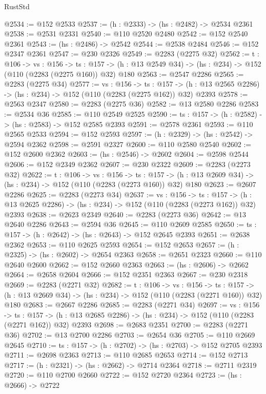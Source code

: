 \begin{lexlean}{RustStd}
\begin{coremodule}
@2534 := @152 @2533
@2537 := (h : @2333) -> (hs : @2482) -> @2534 @2361
@2538 := @2531 @2331
@2540 := @110 @2520 @2480
@2542 := @152 @2540 @2361
@2543 := (hs : @2486) -> @2542
@2544 := @2538 @2484
@2546 := @152 @2347 @2361
@2547 := @230 @2326
@2549 := @2283 (@2275 @32)
@2562 := {t : @106} ->
  {vs : @156} ->
  {ts : @157} -> (h : @13 @2549 @34) -> (hs : @234) -> @152 (@110 (@2283 (@2275 @160)) @32) @180
@2563 := @2547 @2286
@2565 := @2283 (@2275 @34)
@2577 := {vs : @156} ->
  {ts : @157} -> (h : @13 @2565 @2286) -> (hs : @234) -> @152 (@110 (@2283 (@2275 @162)) @32) @2393
@2578 := @2563 @2347
@2580 := @2283 (@2275 @36)
@2582 := @13 @2580 @2286
@2583 := @2534 @36
@2585 := @110 @2549 @2525
@2590 := {ts : @157} -> (h : @2582) -> (hs : @2583) -> @152 @2585 @2393
@2591 := @2578 @2361
@2593 := @110 @2565 @2533
@2594 := @152 @2593
@2597 := (h : @2329) -> (hs : @2542) -> @2594 @2362
@2598 := @2591 @2327
@2600 := @110 @2580 @2540
@2602 := @152 @2600 @2362
@2603 := (hs : @2546) -> @2602
@2604 := @2598 @2544
@2606 := @152 @2349 @2362
@2607 := @230 @2322
@2609 := @2283 (@2273 @32)
@2622 := {t : @106} ->
  {vs : @156} ->
  {ts : @157} -> (h : @13 @2609 @34) -> (hs : @234) -> @152 (@110 (@2283 (@2273 @160)) @32) @180
@2623 := @2607 @2286
@2625 := @2283 (@2273 @34)
@2637 := {vs : @156} ->
  {ts : @157} -> (h : @13 @2625 @2286) -> (hs : @234) -> @152 (@110 (@2283 (@2273 @162)) @32) @2393
@2638 := @2623 @2349
@2640 := @2283 (@2273 @36)
@2642 := @13 @2640 @2286
@2643 := @2594 @36
@2645 := @110 @2609 @2585
@2650 := {ts : @157} -> (h : @2642) -> (hs : @2643) -> @152 @2645 @2393
@2651 := @2638 @2362
@2653 := @110 @2625 @2593
@2654 := @152 @2653
@2657 := (h : @2325) -> (hs : @2602) -> @2654 @2363
@2658 := @2651 @2323
@2660 := @110 @2640 @2600
@2662 := @152 @2660 @2363
@2663 := (hs : @2606) -> @2662
@2664 := @2658 @2604
@2666 := @152 @2351 @2363
@2667 := @230 @2318
@2669 := @2283 (@2271 @32)
@2682 := {t : @106} ->
  {vs : @156} ->
  {ts : @157} -> (h : @13 @2669 @34) -> (hs : @234) -> @152 (@110 (@2283 (@2271 @160)) @32) @180
@2683 := @2667 @2286
@2685 := @2283 (@2271 @34)
@2697 := {vs : @156} ->
  {ts : @157} -> (h : @13 @2685 @2286) -> (hs : @234) -> @152 (@110 (@2283 (@2271 @162)) @32) @2393
@2698 := @2683 @2351
@2700 := @2283 (@2271 @36)
@2702 := @13 @2700 @2286
@2703 := @2654 @36
@2705 := @110 @2669 @2645
@2710 := {ts : @157} -> (h : @2702) -> (hs : @2703) -> @152 @2705 @2393
@2711 := @2698 @2363
@2713 := @110 @2685 @2653
@2714 := @152 @2713
@2717 := (h : @2321) -> (hs : @2662) -> @2714 @2364
@2718 := @2711 @2319
@2720 := @110 @2700 @2660
@2722 := @152 @2720 @2364
@2723 := (hs : @2666) -> @2722

\end{coremodule}
\end{lexlean}
